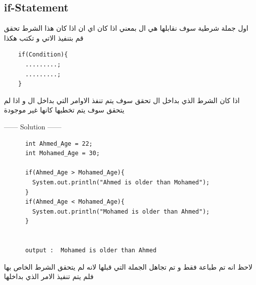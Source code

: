   \subsection{if-Statement}
  \begin{AR}
    اول جملة شرطية سوف نقابلها هي ال  بمعني اذا كان اي ان اذا كان هذا الشرط تحقق قم بتنفيذ الاتي و تكتب هكذا
  \end{AR}
  \begin{verbatim}
    if(Condition){
      .........;
      .........;
    }
  \end{verbatim}
  \begin{AR}
    اذا كان الشرط الذي بداخل ال \LR{( )} تحقق سوف يتم تنفذ الاوامر التي بداخل ال \LR{\{ \}} و اذا لم يتحقق سوف يتم تخطيها كانها غير موجودة
  \end{AR}
  \begin{minipage}[h]{1\textwidth}
  \begin{example}
    \begin{center}
      ------ \textcolor{Solution}{Solution} ------ 
    \end{center} 
    \begin{verbatim}
      int Ahmed_Age = 22;
      int Mohamed_Age = 30;

      if(Ahmed_Age > Mohamed_Age){
        System.out.println("Ahmed is older than Mohamed");
      }
      if(Ahmed_Age < Mohamed_Age){
        System.out.println("Mohamed is older than Ahmed");
      }


      output :  Mohamed is older than Ahmed 
    \end{verbatim}
  \end{example}
\end{minipage} 

  \begin{AR}
    لاحظ انه تم طباعة  فقط و تم تجاهل الجملة التي قبلها لانه لم يتحقق الشرط الخاص بها فلم يتم تنفيذ الامر الذي بداخلها
  \end{AR}
